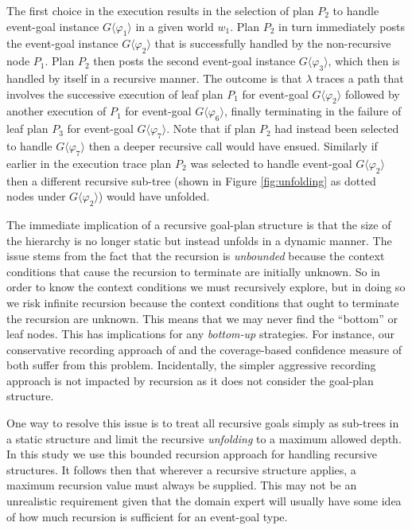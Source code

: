 The first choice in the execution results in the selection of plan $P_2$ to handle event-goal instance $G\langle\varphi_1\rangle$ in a given world $w_1$. Plan $P_2$ in turn immediately posts the event-goal instance $G\langle\varphi_2\rangle$ that is successfully handled by the non-recursive node $P_1$. Plan $P_2$ then posts the second event-goal instance $G\langle\varphi_3\rangle$, which then is handled by itself in a recursive manner.  The outcome is that $\lambda$ traces a path that involves the successive execution of leaf plan $P_1$ for event-goal $G\langle\varphi_2\rangle$ followed by another execution of $P_1$ for event-goal $G\langle\varphi_6\rangle$, finally terminating in the failure of leaf plan $P_3$ for event-goal $G\langle\varphi_7\rangle$. Note that if plan $P_2$ had instead been selected to handle $G\langle\varphi_7\rangle$ then a deeper recursive call would have ensued. Similarly if earlier in the execution trace plan $P_2$ was selected to handle event-goal $G\langle\varphi_2\rangle$ then a different recursive sub-tree (shown in Figure \ref{fig:unfolding} as dotted nodes under $G\langle\varphi_2\rangle$) would have unfolded.

The immediate implication of a recursive goal-plan structure is that the size of the hierarchy is no longer static but instead unfolds in a dynamic manner. The issue stems from the fact that the recursion is \textit{unbounded} because the context conditions that cause the recursion to terminate are initially unknown. So in order to know the context conditions we must recursively explore, but in doing so we risk infinite recursion because the context conditions that ought to terminate the recursion are unknown. This means that we may never find the ``bottom'' or leaf nodes. This has implications for any \textit{bottom-up} strategies. For instance, our conservative recording approach of \cite{Airiau:IJAT:09} and the coverage-based confidence measure of \cite{Singh:AAMAS10} both suffer from this problem. Incidentally, the simpler aggressive recording approach is not impacted by recursion as it does not consider the goal-plan structure.

One way to resolve this issue is to treat all recursive goals simply as sub-trees in a static structure and limit the recursive \textit{unfolding}  to a maximum allowed depth. In this study we use this bounded recursion approach for handling recursive structures. It follows then that wherever a recursive structure applies, a maximum recursion value must always be supplied. This may not be an unrealistic requirement given that the domain expert will usually have some idea of how much recursion is sufficient for an event-goal type.


